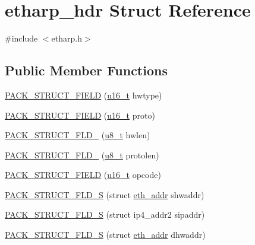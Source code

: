 \hypertarget{structetharp__hdr}{}\section{etharp\+\_\+hdr Struct Reference}
\label{structetharp__hdr}


{\ttfamily \#include $<$etharp.\+h$>$}

\subsection*{Public Member Functions}
\begin{DoxyCompactItemize}
\item 
\hyperlink{structetharp__hdr_a9e768fe69372967f47685000c4b3610c}{P\+A\+C\+K\+\_\+\+S\+T\+R\+U\+C\+T\+\_\+\+F\+I\+E\+LD} (\hyperlink{group__compiler__abstraction_ga77570ac4fcab86864fa1916e55676da2}{u16\+\_\+t} hwtype)
\item 
\hyperlink{structetharp__hdr_a44ab7d21eacebf2c9f566bb4803277ac}{P\+A\+C\+K\+\_\+\+S\+T\+R\+U\+C\+T\+\_\+\+F\+I\+E\+LD} (\hyperlink{group__compiler__abstraction_ga77570ac4fcab86864fa1916e55676da2}{u16\+\_\+t} proto)
\item 
\hyperlink{structetharp__hdr_a1b4df95761337606835bc21163ea6929}{P\+A\+C\+K\+\_\+\+S\+T\+R\+U\+C\+T\+\_\+\+F\+L\+D\+\_} (\hyperlink{group__compiler__abstraction_ga4caecabca98b43919dd11be1c0d4cd8e}{u8\+\_\+t} hwlen)
\item 
\hyperlink{structetharp__hdr_a1b9ea937c307c6957789b32b27425e8f}{P\+A\+C\+K\+\_\+\+S\+T\+R\+U\+C\+T\+\_\+\+F\+L\+D\+\_} (\hyperlink{group__compiler__abstraction_ga4caecabca98b43919dd11be1c0d4cd8e}{u8\+\_\+t} protolen)
\item 
\hyperlink{structetharp__hdr_a3b20d36ae72daac8189ced51d1be27cf}{P\+A\+C\+K\+\_\+\+S\+T\+R\+U\+C\+T\+\_\+\+F\+I\+E\+LD} (\hyperlink{group__compiler__abstraction_ga77570ac4fcab86864fa1916e55676da2}{u16\+\_\+t} opcode)
\item 
\hyperlink{structetharp__hdr_a3a446986ed72900fb5d88d7134677f5c}{P\+A\+C\+K\+\_\+\+S\+T\+R\+U\+C\+T\+\_\+\+F\+L\+D\+\_\+S} (struct \hyperlink{structeth__addr}{eth\+\_\+addr} shwaddr)
\item 
\hyperlink{structetharp__hdr_ada173e74740db9db872ff4deb694df2f}{P\+A\+C\+K\+\_\+\+S\+T\+R\+U\+C\+T\+\_\+\+F\+L\+D\+\_\+S} (struct ip4\+\_\+addr2 sipaddr)
\item 
\hyperlink{structetharp__hdr_a38b79f2bc964169414a9ae3b77f461d5}{P\+A\+C\+K\+\_\+\+S\+T\+R\+U\+C\+T\+\_\+\+F\+L\+D\+\_\+S} (struct \hyperlink{structeth__addr}{eth\+\_\+addr} dhwaddr)

\end{DoxyCompactItemize}
